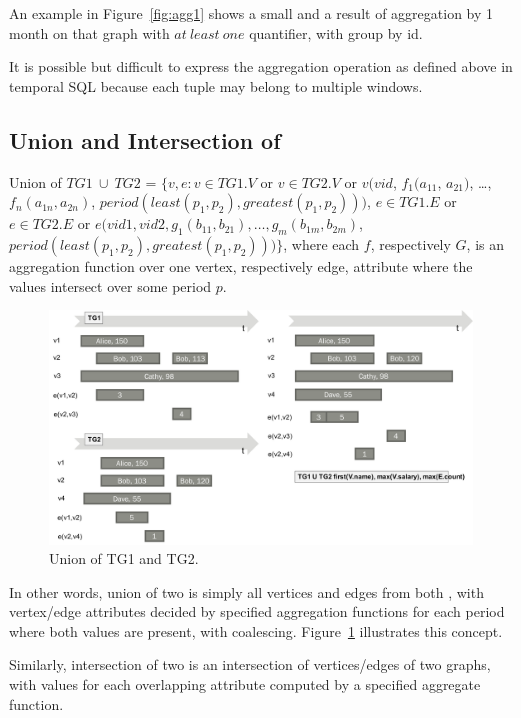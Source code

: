 An example in Figure~\ref{fig:agg1} shows a small \tg and a result of
aggregation by 1 month on that graph with $at\ least\ one$ quantifier,
with group by id.

It is possible but difficult to express the aggregation operation as
defined above in temporal SQL because each tuple may belong to
multiple windows.

\subsection{Union and Intersection of \tgs}

\begin{definition}[Union]
Union of $TG1\ \cup\ TG2$ = $\{v, e: v \in TG1.V$ or $v \in TG2.V$ or
$v(vid$, $f_1(a_{11}$, $a_{21})$, \ldots, $f_n(a_{1n}, a_{2n})$,
$period(least(p_1, p_2), greatest(p_1, p_2)))$, $e \in TG1.E$ or $e
\in TG2.E$ or $e(vid1, vid2, g_1(b_{11}, b_{21}), \ldots, g_m(b_{1m},
b_{2m})$, $period(least(p_1, p_2), greatest(p_1, p_2))) \}$, where
each $f$, respectively $G$, is an aggregation function over one
vertex, respectively edge, attribute where the values intersect over
some period $p$.
\label{def:union}
\end{definition}

\begin{figure}
\includegraphics[width=6.5in]{figs/union.pdf}
\caption{Union of TG1 and TG2.}
\label{fig:union}
\end{figure}

In other words, union of two \tgs is simply all vertices and edges
from both \tgs, with vertex/edge attributes decided by specified
aggregation functions for each period where both values are present,
with coalescing.  Figure~\ref{fig:union} illustrates this concept.

Similarly, intersection of two \tgs is an intersection of
vertices/edges of two graphs, with values for each overlapping
attribute computed by a specified aggregate function.

